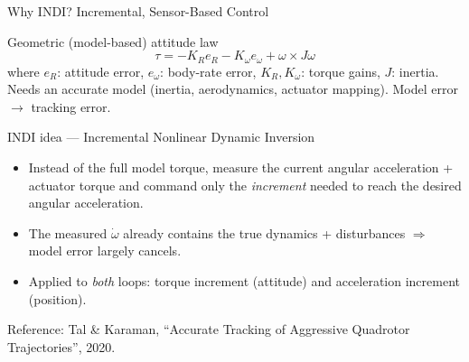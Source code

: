 \documentclass[aspectratio=169,11pt]{beamer}
\begin{document}
\begin{frame}{Why INDI? Incremental, Sensor-Based Control}
\begin{block}{Geometric (model-based) attitude law}
\[
\tau = -K_R e_R - K_\omega e_\omega + \omega \times J\omega
\]
{\scriptsize where \(e_R\): attitude error, \(e_\omega\): body-rate error, \(K_R,K_\omega\): torque gains, \(J\): inertia.}\\[2pt]
Needs an accurate model (inertia, aerodynamics, actuator mapping). Model error \(\rightarrow\) tracking error.
\end{block}

\begin{block}{INDI idea --- Incremental Nonlinear Dynamic Inversion}
\begin{itemize}\small
  \item Instead of the full model torque, measure the current angular acceleration + actuator torque and command only the \emph{increment} needed to reach the desired angular acceleration.
  \item The measured \(\dot\omega\) already contains the true dynamics + disturbances $\Rightarrow$ model error largely cancels.
  \item Applied to \emph{both} loops: torque increment (attitude) and acceleration increment (position).
\end{itemize}
\end{block}
{\footnotesize Reference: Tal \& Karaman, ``Accurate Tracking of Aggressive Quadrotor Trajectories'', 2020.}
\end{frame}
\end{document}
